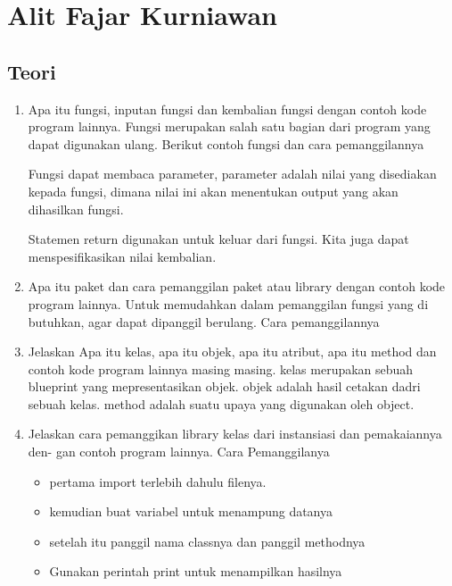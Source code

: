 
\section{Alit Fajar Kurniawan}
\subsection{Teori}
\begin{enumerate}
    \item Apa itu fungsi, inputan fungsi dan kembalian fungsi dengan contoh kode program
    lainnya.
    Fungsi merupakan salah satu bagian dari program yang dapat digunakan ulang.
    Berikut contoh fungsi dan cara pemanggilannya
    

    Fungsi dapat membaca parameter, parameter adalah nilai yang disediakan kepada fungsi, dimana nilai ini akan menentukan output yang akan dihasilkan fungsi.
    

    Statemen return digunakan untuk keluar dari fungsi. Kita juga dapat menspesifikasikan nilai kembalian.
    

    \item Apa itu paket dan cara pemanggilan paket atau library dengan contoh kode
    program lainnya.
    Untuk memudahkan dalam pemanggilan fungsi yang di butuhkan, agar dapat dipanggil berulang.
    Cara pemanggilannya
    

    \item Jelaskan Apa itu kelas, apa itu objek, apa itu atribut, apa itu method dan
    contoh kode program lainnya masing masing.
    kelas merupakan sebuah blueprint yang mepresentasikan objek.
    objek adalah hasil cetakan dadri sebuah kelas.
    method adalah suatu upaya yang digunakan oleh object.
    

    \item Jelaskan cara pemanggikan library kelas dari instansiasi dan pemakaiannya den-
    gan contoh program lainnya.
    Cara Pemanggilanya 
    \begin{itemize}
        \item pertama import terlebih dahulu filenya.
        \item kemudian buat variabel untuk menampung datanya
        \item setelah itu panggil nama classnya dan panggil methodnya
        \item Gunakan perintah print untuk menampilkan hasilnya


\end{itemize}
\end{enumerate}

